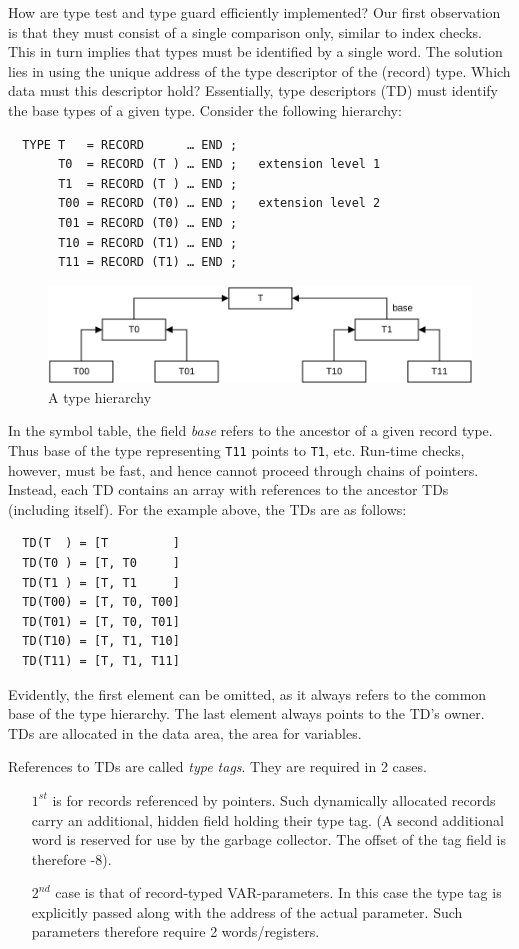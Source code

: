How are type test and type guard efficiently implemented? Our first observation is that they must
consist of a single comparison only, similar to index checks. This in turn implies that types must be
identified by a single word. The solution lies in using the unique address of the type descriptor of
the (record) type. Which data must this descriptor hold? Essentially, type descriptors (TD) must
identify the base types of a given type. Consider the following hierarchy:
\begin{verbatim}
  TYPE T   = RECORD      … END ;
       T0  = RECORD (T ) … END ;   extension level 1 
       T1  = RECORD (T ) … END ;
       T00 = RECORD (T0) … END ;   extension level 2
       T01 = RECORD (T0) … END ;
       T10 = RECORD (T1) … END ;
       T11 = RECORD (T1) … END ;
\end{verbatim}
\begin{figure}[h!]
  \centering
  \includegraphics[width=.9\textwidth]{i/C/9.png}
  \caption{A type hierarchy}
  \label{fig:typarch}
\end{figure}

In the symbol table, the field \emph{base} refers to the ancestor of a given record type. Thus base of
the type representing \verb|T11| points to \verb|T1|, etc. Run-time checks, however, must be fast, and
hence cannot proceed through chains of pointers. Instead, each TD contains an array with references to
the ancestor TDs (including itself). For the example above, the TDs are as follows:
\begin{verbatim}
  TD(T  ) = [T         ]     
  TD(T0 ) = [T, T0     ]
  TD(T1 ) = [T, T1     ]
  TD(T00) = [T, T0, T00]
  TD(T01) = [T, T0, T01]
  TD(T10) = [T, T1, T10]
  TD(T11) = [T, T1, T11]
\end{verbatim}

Evidently, the first element can be omitted, as it always refers to the common base of the type
hierarchy. The last element always points to the TD’s owner. TDs are allocated in the data area, the
area for variables.

References to TDs are called \emph{type tags}. They are required in 2 cases.
\begin{itemize}
  \item[$1^{st}$] is for records referenced by pointers. Such dynamically allocated records carry an
    additional, hidden field holding their type tag. (A second additional word is reserved for use by
    the garbage collector. The offset of the tag field is therefore -8).
  \item[$2^{nd}$] case is that of record-typed VAR-parameters. In this case the type tag is explicitly
    passed along with the address of the actual parameter. Such parameters therefore require 2
    words/registers.
\end{itemize}

